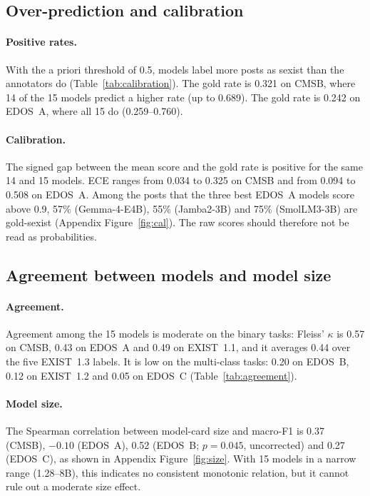 \documentclass[11pt]{article}
\newcommand{\tbl}[1]{}
\begin{document}
\subsection{Over-prediction and calibration}
\tbl{calibration}

\paragraph{Positive rates.} With the a priori threshold of 0.5, models label more posts as sexist than the annotators do (Table~\ref{tab:calibration}). The gold rate is 0.321 on CMSB, where 14 of the 15 models predict a higher rate (up to 0.689). The gold rate is 0.242 on EDOS~A, where all 15 do (0.259--0.760).

\paragraph{Calibration.} The signed gap between the mean score and the gold rate is positive for the same 14 and 15 models. ECE ranges from 0.034 to 0.325 on CMSB and from 0.094 to 0.508 on EDOS~A. Among the posts that the three best EDOS~A models score above 0.9, 57\% (Gemma-4-E4B), 55\% (Jamba2-3B) and 75\% (SmolLM3-3B) are gold-sexist (Appendix Figure~\ref{fig:cal}). The raw scores should therefore not be read as probabilities.

\subsection{Agreement between models and model size}
\tbl{agreement}

\paragraph{Agreement.} Agreement among the 15 models is moderate on the binary tasks: Fleiss' $\kappa$ is 0.57 on CMSB, 0.43 on EDOS~A and 0.49 on EXIST~1.1, and it averages 0.44 over the five EXIST~1.3 labels. It is low on the multi-class tasks: 0.20 on EDOS~B, 0.12 on EXIST~1.2 and 0.05 on EDOS~C (Table~\ref{tab:agreement}).

\paragraph{Model size.} The Spearman correlation between model-card size and macro-F1 is 0.37 (CMSB), $-0.10$ (EDOS~A), 0.52 (EDOS~B; $p = 0.045$, uncorrected) and 0.27 (EDOS~C), as shown in Appendix Figure~\ref{fig:size}. With 15 models in a narrow range (1.28--8B), this indicates no consistent monotonic relation, but it cannot rule out a moderate size effect.
\end{document}
